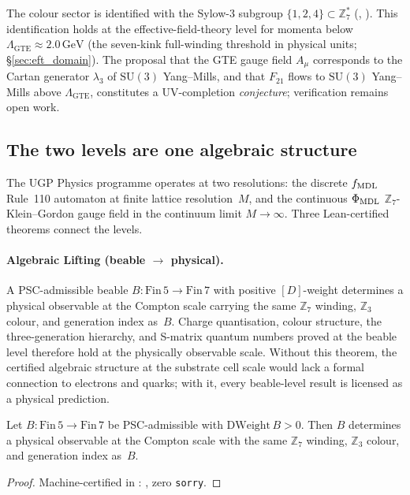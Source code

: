 The colour sector is identified with the Sylow-3 subgroup $\{1,2,4\} \subset \mathbb{Z}_7^*$
(, ).
This identification holds at the effective-field-theory level for momenta below
$\Lambda_{\mathrm{GTE}} \approx 2.0\,\mathrm{GeV}$ (the seven-kink full-winding threshold in physical units; \S\ref{sec:eft_domain}).
The proposal that the GTE gauge field $A_\mu$ corresponds to the Cartan generator $\lambda_3$ of $\mathrm{SU}(3)$ Yang--Mills, and that $F_{21}$ flows to $\mathrm{SU}(3)$ Yang--Mills above $\Lambda_{\mathrm{GTE}}$, constitutes a UV-completion \emph{conjecture}; verification remains open work.

\subsection{The two levels are one algebraic structure}
\label{sec:two_levels}

The UGP Physics programme operates at two resolutions: the discrete $f_{\rm MDL}$ Rule~110 automaton at finite lattice resolution~$M$, and the continuous $\Phi_{\rm MDL}$ $\mathbb{Z}_7$-Klein--Gordon gauge field in the continuum limit $M \to \infty$.
Three Lean-certified theorems connect the levels.

\paragraph{Algebraic Lifting (beable $\to$ physical).}
A PSC-admissible beable $B : \mathrm{Fin}\,5 \to \mathrm{Fin}\,7$ with positive $[D]$-weight determines a physical observable at the Compton scale carrying the same $\mathbb{Z}_7$ winding, $\mathbb{Z}_3$ colour, and generation index as~$B$.
Charge quantisation, colour structure, the three-generation hierarchy, and S-matrix quantum numbers proved at the beable level therefore hold at the physically observable scale.
Without this theorem, the certified algebraic structure at the substrate cell scale would lack a formal connection to electrons and quarks; with it, every beable-level result is licensed as a physical prediction.

\begin{theorem}
\label{thm:algebraic_lifting}
Let $B : \mathrm{Fin}\,5 \to \mathrm{Fin}\,7$ be PSC-admissible with $\mathrm{DWeight}\,B > 0$.
Then $B$ determines a physical observable at the Compton scale with the same $\mathbb{Z}_7$ winding, $\mathbb{Z}_3$ colour, and generation index as~$B$.
\begin{proof}
Machine-certified in : , zero \texttt{sorry}.
\end{proof}
\end{theorem}

